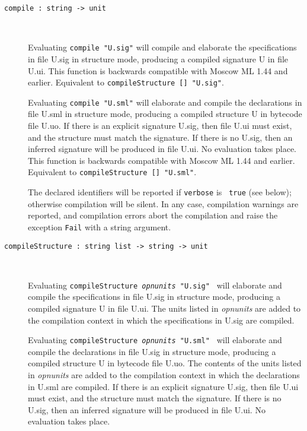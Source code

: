 \documentclass[fleqn,a4paper]{article}
\begin{document}
\begin{description}

\item[{\tt compile :\ string -> unit}]\mbox{ }
  
  Evaluating {\tt compile "{\rm U.sig}"} will compile and elaborate
  the specifications in file U.sig in structure mode, producing a
  compiled signature U in file U.ui.  This function is backwards
  compatible with Moscow ML 1.44 and earlier.  Equivalent to
  \texttt{compileStructure [] "{\rm U.sig}"}.
  
  Evaluating {\tt compile "{\rm U.sml}"} will elaborate and compile
  the declarations in file U.sml in structure mode, producing a
  compiled structure U in bytecode file U.uo.  If there is an explicit
  signature U.sig, then file U.ui must exist, and the structure must
  match the signature.  If there is no U.sig, then an inferred
  signature will be produced in file U.ui.  No evaluation takes place.
  This function is backwards compatible with Moscow ML 1.44 and
  earlier.  Equivalent to \texttt{compileStructure [] "{\rm U.sml}"}.

  The declared identifiers will be reported if {\tt verbose} is {\tt
    true} (see below); otherwise compilation will be silent.  In any
    case, compilation warnings are reported, and compilation errors
    abort the compilation and raise the exception {\tt Fail} with a
    string argument.

\item[{\tt compileStructure :\ string list -> string -> unit}]\mbox{ }
  
  Evaluating \texttt{compileStructure \textit{opnunits} "{\rm U.sig}"
    } will elaborate and compile the specifications in file U.sig in
  structure mode, producing a compiled signature U in file U.ui.  The
  units listed in \textit{opnunits} are added to the compilation
  context in which the specifications in U.sig are compiled.  
  
  Evaluating \texttt{compileStructure \textit{opnunits} "{\rm U.sml}"
    } will elaborate and compile the declarations in file U.sig in
  structure mode, producing a compiled structure U in bytecode file
  U.uo.  The contents of the units listed in \textit{opnunits} are
  added to the compilation context in which the declarations in U.sml
  are compiled.  If there is an explicit signature U.sig, then file
  U.ui must exist, and the structure must match the signature.  If
  there is no U.sig, then an inferred signature will be produced in
  file U.ui.  No evaluation takes place.



\end{description}
\end{document}
